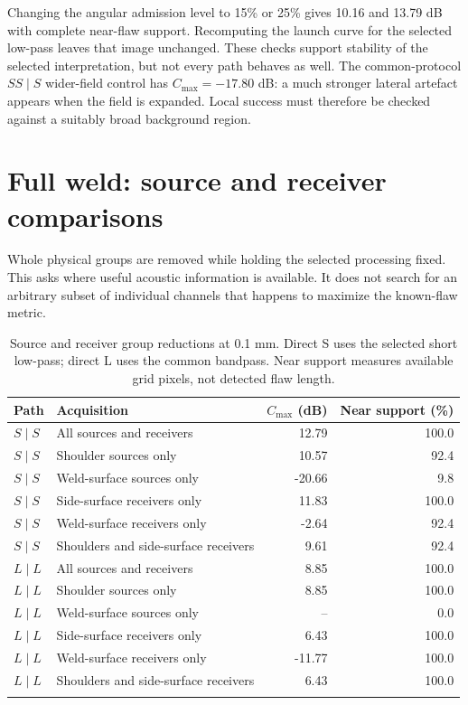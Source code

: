 \documentclass[11pt]{article}
\begin{document}
Changing the angular admission level to 15\% or 25\% gives 10.16 and 13.79 dB with complete near-flaw support. Recomputing the launch curve for the selected low-pass leaves that image unchanged. These checks support stability of the selected interpretation, but not every path behaves as well. The common-protocol $SS\mid S$ wider-field control has $C_{\max}=-17.80$ dB: a much stronger lateral artefact appears when the field is expanded. Local success must therefore be checked against a suitably broad background region.


\section{Full weld: source and receiver comparisons}
\label{saft:archive:full:acquisition_results}
Whole physical groups are removed while holding the selected processing fixed. This asks where useful acoustic information is available. It does not search for an arbitrary subset of individual channels that happens to maximize the known-flaw metric.

\begin{table}[!htbp]\centering\small
\caption{Source and receiver group reductions at 0.1 mm. Direct S uses the selected short low-pass; direct L uses the common bandpass. Near support measures available grid pixels, not detected flaw length.}
\begin{tabularx}{\linewidth}{@{}lXrr@{}}\toprule
Path & Acquisition & $C_{\max}$ (dB) & Near support (\%)\\\midrule
$S\mid S$ & All sources and receivers & 12.79 & 100.0 \\
$S\mid S$ & Shoulder sources only & 10.57 & 92.4 \\
$S\mid S$ & Weld-surface sources only & -20.66 & 9.8 \\
$S\mid S$ & Side-surface receivers only & 11.83 & 100.0 \\
$S\mid S$ & Weld-surface receivers only & -2.64 & 92.4 \\
$S\mid S$ & Shoulders and side-surface receivers & 9.61 & 92.4 \\
\addlinespace
$L\mid L$ & All sources and receivers & 8.85 & 100.0 \\
$L\mid L$ & Shoulder sources only & 8.85 & 100.0 \\
$L\mid L$ & Weld-surface sources only & -- & 0.0 \\
$L\mid L$ & Side-surface receivers only & 6.43 & 100.0 \\
$L\mid L$ & Weld-surface receivers only & -11.77 & 100.0 \\
$L\mid L$ & Shoulders and side-surface receivers & 6.43 & 100.0 \\
\addlinespace

\bottomrule\end{tabularx}
\label{saft:archive:full:groups}
\end{table}
\end{document}
